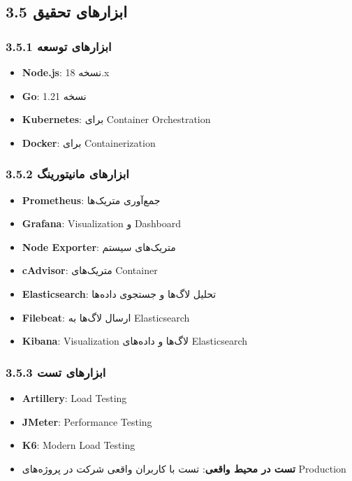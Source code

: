 \documentclass[
]{article}
\providecommand{\tightlist}{%
  \setlength{\itemsep}{0pt}\setlength{\parskip}{0pt}}
\begin{document}
\subsection{3.5 ابزارهای
تحقیق}\label{ux627ux628ux632ux627ux631ux647ux627ux6cc-ux62aux62dux642ux6ccux642}

\subsubsection{3.5.1 ابزارهای
توسعه}\label{ux627ux628ux632ux627ux631ux647ux627ux6cc-ux62aux648ux633ux639ux647}

\begin{itemize}
\tightlist
\item
  \textbf{Node.js}: نسخه 18.x
\item
  \textbf{Go}: نسخه 1.21
\item
  \textbf{Kubernetes}: برای Container Orchestration
\item
  \textbf{Docker}: برای Containerization
\end{itemize}

\subsubsection{3.5.2 ابزارهای
مانیتورینگ}\label{ux627ux628ux632ux627ux631ux647ux627ux6cc-ux645ux627ux646ux6ccux62aux648ux631ux6ccux646ux6af}

\begin{itemize}
\tightlist
\item
  \textbf{Prometheus}: جمع‌آوری متریک‌ها
\item
  \textbf{Grafana}: Visualization و Dashboard
\item
  \textbf{Node Exporter}: متریک‌های سیستم
\item
  \textbf{cAdvisor}: متریک‌های Container
\item
  \textbf{Elasticsearch}: تحلیل لاگ‌ها و جستجوی داده‌ها
\item
  \textbf{Filebeat}: ارسال لاگ‌ها به Elasticsearch
\item
  \textbf{Kibana}: Visualization لاگ‌ها و داده‌های Elasticsearch
\end{itemize}

\subsubsection{3.5.3 ابزارهای
تست}\label{ux627ux628ux632ux627ux631ux647ux627ux6cc-ux62aux633ux62a}

\begin{itemize}
\tightlist
\item
  \textbf{Artillery}: Load Testing
\item
  \textbf{JMeter}: Performance Testing
\item
  \textbf{K6}: Modern Load Testing
\item
  \textbf{تست در محیط واقعی}: تست با کاربران واقعی شرکت در پروژه‌های
  Production
\end{itemize}
\end{document}
